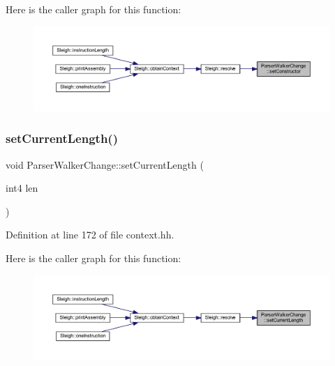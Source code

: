 Here is the caller graph for this function\+:
\nopagebreak
\begin{figure}[H]
\begin{center}
\leavevmode
\includegraphics[width=350pt]{class_parser_walker_change_a4526bad75395a124aebb7cf7c2b09f1b_icgraph}
\end{center}
\end{figure}
\mbox{\label{class_parser_walker_change_ae7d8dad0cb3843f51e7d169f1aae15ea}} 
\subsubsection{\texorpdfstring{setCurrentLength()}{setCurrentLength()}}
{\footnotesize\ttfamily void Parser\+Walker\+Change\+::set\+Current\+Length (\begin{DoxyParamCaption}\item[{int4}]{len }\end{DoxyParamCaption})\hspace{0.3cm}{\ttfamily [inline]}}



Definition at line 172 of file context.\+hh.

Here is the caller graph for this function\+:
\nopagebreak
\begin{figure}[H]
\begin{center}
\leavevmode
\includegraphics[width=350pt]{class_parser_walker_change_ae7d8dad0cb3843f51e7d169f1aae15ea_icgraph}
\end{center}
\end{figure}
\mbox{\label{class_parser_walker_change_a95880c16791ab4b8a3f3556826063c0c}} 

